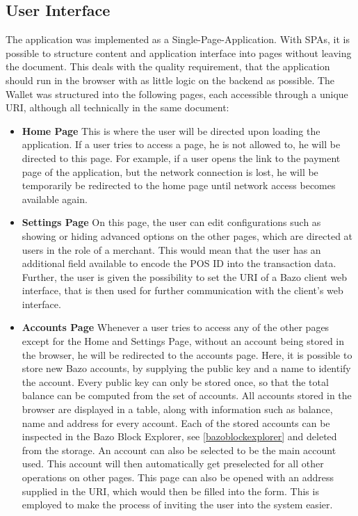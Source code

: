 \subsection{User Interface}\label{userinterface}
The application was implemented as a Single-Page-Application. With SPAs, it is possible to structure content and application interface into pages without leaving the document. %
This deals with the quality requirement, that the application should run in the browser with as little logic on the backend as possible. The Wallet was structured into the following pages, each accessible through a unique URI, although all technically in the same document:
\begin{itemize}
\item \textbf{Home Page}
This is where the user will be directed upon loading the application. If a user tries to access a page, he is not allowed to, he will be directed to this page. For example, if a user opens the link to the payment page of the application, but the network connection is lost, he will be temporarily be redirected to the home page until network access becomes available again.
\item \textbf{Settings Page}
On this page, the user can edit configurations such as showing or hiding advanced options on the other pages, which are directed at users in the role of a merchant. This would mean that the user has an additional field available to encode the POS ID into the transaction data. Further, the user is given the possibility to set the URI of a Bazo client web interface, that is then used for further communication with the client's web interface.
\item \textbf{Accounts Page}
Whenever a user tries to access any of the other pages except for the Home and Settings Page, without an account being stored in the browser, he will be redirected to the accounts page. Here, it is possible to store new Bazo accounts, by supplying the public key and a name to identify the account. Every public key can only be stored once, so that the total balance can be computed from the set of accounts. All accounts stored in the browser are displayed in a table, along with information such as balance, name and address for every account. Each of the stored accounts can be inspected in the Bazo Block Explorer, see \ref{bazoblockexplorer} and deleted from the storage. An account can also be selected to be the main account used. This account will then automatically get preselected for all other operations on other pages.
This page can also be opened with an address supplied in the URI, which would then be filled into the form. This is employed to make the process of inviting the user into the system easier.

\end{itemize}

